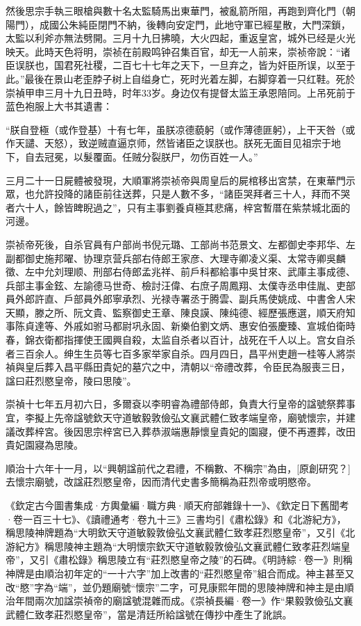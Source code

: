 然後思宗手執三眼槍與數十名太監騎馬出東華門，被亂箭所阻，再跑到齊化門（朝陽門），成國公朱純臣閉門不納，後轉向安定門，此地守軍已經星散，大門深鎖，太監以利斧亦無法劈開。三月十九日拂曉，大火四起，重返皇宮，城外已经是火光映天。此時天色将明，崇祯在前殿鸣钟召集百官，却无一人前来，崇祯帝說：“诸臣误朕也，国君死社稷，二百七十七年之天下，一旦弃之，皆为奸臣所误，以至于此。”最後在景山老歪脖子树上自缢身亡，死时光着左脚，右脚穿着一只红鞋。死於崇禎甲申三月十九日丑時，时年33岁。身边仅有提督太监王承恩陪同。上吊死前于蓝色袍服上大书其遺書：

“朕自登極（或作登基）十有七年，虽朕凉德藐躬（或作薄德匪躬），上干天咎（或作天譴、天怒），致逆贼直逼京师，然皆诸臣之误朕也。朕死无面目见祖宗于地下，自去冠冕，以髮覆面。任贼分裂朕尸，勿伤百姓一人。”

三月二十一日屍體被發現，大順軍將崇祯帝與周皇后的屍棺移出宮禁，在東華門示眾，也允許投降的諸臣前往送葬，只是人數不多，“諸臣哭拜者三十人，拜而不哭者六十人，餘皆睥睨過之”，只有主事劉養貞極其悲痛，梓宮暫厝在紫禁城北面的河邊。

崇祯帝死後，自杀官員有户部尚书倪元璐、工部尚书范景文、左都御史李邦华、左副都御史施邦曜、协理京营兵部右侍郎王家彦、大理寺卿凌义渠、太常寺卿吳麟徵、左中允刘理顺、刑部右侍郎孟兆祥、前戶科都給事中吳甘來、武庫主事成德、兵部主事金鉉、左諭德马世奇、檢討汪偉、右庶子周鳳翔、太僕寺丞申佳胤、吏部員外郎許直、戶部員外郎寧承烈、光禄寺署丞于腾雲、副兵馬使姚成、中書舍人宋天顯，滕之所、阮文貴、監察御史王章、陳良謨、陳纯德、經歷張應選，順天府知事陈貞達等、外戚如驸马都尉巩永固、新樂伯劉文炳、惠安伯張慶臻、宣城伯衛時春，錦衣衛都指揮使王國興自殺，太监自杀者以百计，战死在千人以上。宫女自杀者三百余人。绅生生员等七百多家举家自杀。四月四日，昌平州吏趙一桂等人將崇禎與皇后葬入昌平縣田貴妃的墓穴之中，清朝以“帝禮改葬，令臣民為服喪三日，諡曰莊烈愍皇帝，陵曰思陵”。

崇禎十七年五月初六日，多爾袞以李明睿為禮部侍郎，負責大行皇帝的諡號祭葬事宜，李擬上先帝諡號欽天守道敏毅敦儉弘文襄武體仁致孝端皇帝，廟號懷宗，并建議改葬梓宮。後因思宗梓宮已入葬恭淑端惠靜懷皇貴妃的園寢，便不再遷葬，改田貴妃園寢為思陵。

順治十六年十一月，以“興朝諡前代之君禮，不稱數、不稱宗”為由，[原創研究？]去懷宗廟號，改諡莊烈愍皇帝，因而清代史書多簡稱為莊烈帝或明愍帝。

《欽定古今圖書集成·方輿彙編·職方典·順天府部雜錄十一》、《欽定日下舊聞考·卷一百三十七》、《讀禮通考·卷九十三》三書均引《肅松錄》和《北游紀方》，稱思陵神牌題為“大明欽天守道敏毅敦儉弘文襄武體仁致孝莊烈愍皇帝”，又引《北游紀方》稱思陵神主題為“大明懷宗欽天守道敏毅敦儉弘文襄武體仁致孝莊烈端皇帝”，又引《肅松錄》稱思陵立有“莊烈愍皇帝之陵”的石碑。《明詩綜·卷一》則稱神牌是由順治初年定的“一十六字”加上改書的“莊烈愍皇帝”組合而成。神主甚至又改“愍”字為“端”，並仍題廟號“懷宗”二字，可見康熙年間的思陵神牌和神主是由順治年間兩次加諡崇禎帝的廟諡號混雜而成。《崇禎長編·卷一》作“果毅敦儉弘文襄武體仁致孝莊烈愍皇帝”，當是清廷所給諡號在傳抄中產生了訛誤。

